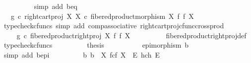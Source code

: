 \begin{isabellebody}
\ \ \ \ \ \ \ \ \isamarkupfalse%
\ {\isacharparenleft}{\kern0pt}simp\ add{\isacharcolon}{\kern0pt}\ b{\isacharunderscore}{\kern0pt}eq{\isacharparenright}{\kern0pt}\isanewline
\ \ \ \ \ \ \isamarkupfalse%
\ \isamarkupfalse%
\ {\isachardoublequoteopen}{\isachardot}{\kern0pt}{\isachardot}{\kern0pt}{\isachardot}{\kern0pt}\ {\isacharequal}{\kern0pt}\ g\ {\isasymcirc}\isactrlsub c\ right{\isacharunderscore}{\kern0pt}cart{\isacharunderscore}{\kern0pt}proj\ X\ X\ {\isasymcirc}\isactrlsub c\ fibered{\isacharunderscore}{\kern0pt}product{\isacharunderscore}{\kern0pt}morphism\ X\ f\ f\ X{\isachardoublequoteclose}\isanewline
\ \ \ \ \ \ \ \ \isamarkupfalse%
\ {\isacharparenleft}{\kern0pt}typecheck{\isacharunderscore}{\kern0pt}cfuncs{\isacharcomma}{\kern0pt}\ simp\ add{\isacharcolon}{\kern0pt}\ comp{\isacharunderscore}{\kern0pt}associative{}\ right{\isacharunderscore}{\kern0pt}cart{\isacharunderscore}{\kern0pt}proj{\isacharunderscore}{\kern0pt}cfunc{\isacharunderscore}{\kern0pt}cross{\isacharunderscore}{\kern0pt}prod{\isacharparenright}{\kern0pt}\isanewline
\ \ \ \ \ \ \isamarkupfalse%
\ \isamarkupfalse%
\ {\isachardoublequoteopen}{\isachardot}{\kern0pt}{\isachardot}{\kern0pt}{\isachardot}{\kern0pt}\ {\isacharequal}{\kern0pt}\ g\ {\isasymcirc}\isactrlsub c\ fibered{\isacharunderscore}{\kern0pt}product{\isacharunderscore}{\kern0pt}right{\isacharunderscore}{\kern0pt}proj\ X\ f\ f\ X{\isachardoublequoteclose}\isanewline
\ \ \ \ \ \ \ \ \isamarkupfalse%
\ fibered{\isacharunderscore}{\kern0pt}product{\isacharunderscore}{\kern0pt}right{\isacharunderscore}{\kern0pt}proj{\isacharunderscore}{\kern0pt}def\ \isamarkupfalse%
\ {\isacharparenleft}{\kern0pt}typecheck{\isacharunderscore}{\kern0pt}cfuncs{\isacharparenright}{\kern0pt}\isanewline
\ \ \ \ \ \ \isamarkupfalse%
\ \isamarkupfalse%
\ {\isacharquery}{\kern0pt}thesis\isacommand{{\isachardot}{\kern0pt}}\isamarkupfalse%
\isanewline
\ \ \ \ \isamarkupfalse%
\isanewline
\ \ \ \ \isamarkupfalse%
\ {\isachardoublequoteopen}epimorphism\ b{\isachardoublequoteclose}\isanewline
\ \ \ \ \ \ \isamarkupfalse%
\ {\isacharparenleft}{\kern0pt}simp\ add{\isacharcolon}{\kern0pt}\ b{\isacharunderscore}{\kern0pt}epi{\isacharparenright}{\kern0pt}\isanewline
\ \ \isamarkupfalse%
\ \ \isanewline
\ \ \isamarkupfalse%
\ {\isachardoublequoteopen}{\isasymexists}{\isacharbang}{\kern0pt}b{\isachardot}{\kern0pt}\ b\ {\isacharcolon}{\kern0pt}\ X\ \isactrlbsub f\isactrlesub {\isasymtimes}\isactrlsub c\isactrlbsub f\isactrlesub \ X\ {\isasymrightarrow}\ E\ \isactrlbsub h\isactrlesub {\isasymtimes}\isactrlsub c\isactrlbsub h\isactrlesub \ E\ {\isasymand}\isanewline

\end{isabellebody}
